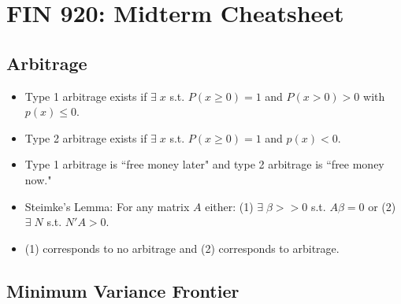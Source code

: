\documentclass{article}
\begin{document}
\twocolumn

\section*{FIN 920: Midterm Cheatsheet}

\subsection*{Arbitrage}

\begin{itemize}

\item Type 1 arbitrage exists if $\exists \; x$ s.t. $P(x \ge 0) = 1$ and $P(x > 0) > 0$ with $p(x) \le 0$.

\item Type 2 arbitrage exists if $\exists \; x$ s.t. $P(x \ge 0) = 1$ and $p(x) < 0$.

\item Type 1 arbitrage is ``free money later" and type 2 arbitrage is ``free money now."

\item Steimke's Lemma: For any matrix $A$ either: (1) $\exists \; \beta >> 0$ s.t. $A\beta = 0$ or (2) $\exists \; N$ s.t. $N'A > 0$.

\item (1) corresponds to no arbitrage and (2) corresponds to arbitrage.

\end{itemize}

\subsection*{Minimum Variance Frontier}
\end{document}
